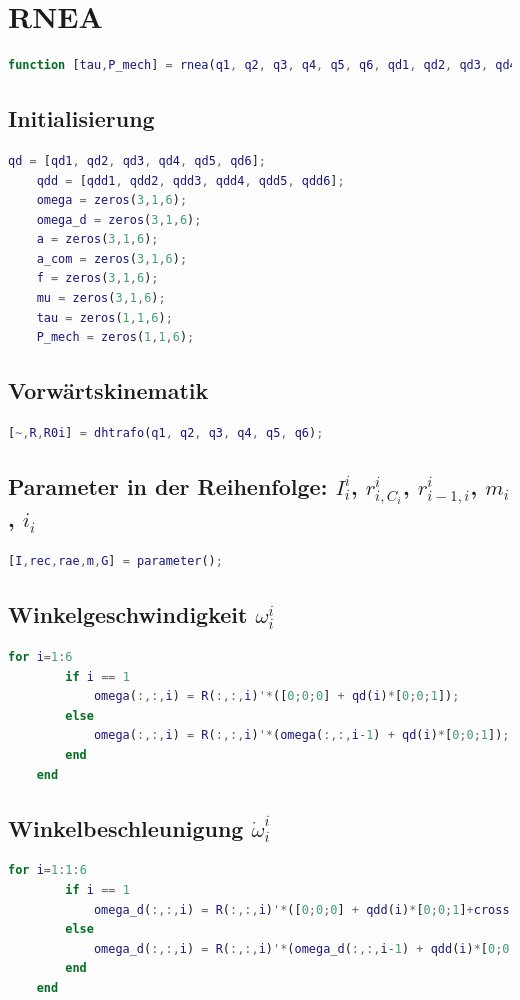 \section{RNEA}
\label{add:rnea}
%
\begin{lstlisting}[language=Matlab, numbers=none]
	function [tau,P_mech] = rnea(q1, q2, q3, q4, q5, q6, qd1, qd2, qd3, qd4, qd5, qd6, qdd1, qdd2, qdd3, qdd4, qdd5, qdd6)
\end{lstlisting}
%
\subsection{Initialisierung}
%
\begin{lstlisting}[language=Matlab, numbers=none]
	qd = [qd1, qd2, qd3, qd4, qd5, qd6];
	qdd = [qdd1, qdd2, qdd3, qdd4, qdd5, qdd6];
	omega = zeros(3,1,6);
	omega_d = zeros(3,1,6);
	a = zeros(3,1,6);
	a_com = zeros(3,1,6);
	f = zeros(3,1,6);
	mu = zeros(3,1,6);
	tau = zeros(1,1,6);
	P_mech = zeros(1,1,6);
\end{lstlisting}
%
\subsection{Vorwärtskinematik}
%
\begin{lstlisting}[language=Matlab, numbers=none]
	[~,R,R0i] = dhtrafo(q1, q2, q3, q4, q5, q6);
\end{lstlisting}
%
\subsection{Parameter in der Reihenfolge: $I^{i}_{i}$, $r^{i}_{i,C_i}$, $r^{i}_{i-1,i}$, $m_i$, $i_i$}
%
\begin{lstlisting}[language=Matlab, numbers=none]
	[I,rec,rae,m,G] = parameter();
\end{lstlisting}
%
\subsection{Winkelgeschwindigkeit $\omega^{i}_i$}
%
\begin{lstlisting}[language=Matlab, numbers=none]
	for i=1:6
		if i == 1
			omega(:,:,i) = R(:,:,i)'*([0;0;0] + qd(i)*[0;0;1]);
		else
			omega(:,:,i) = R(:,:,i)'*(omega(:,:,i-1) + qd(i)*[0;0;1]);
		end
	end
\end{lstlisting}
%
\subsection{Winkelbeschleunigung $\dot\omega^{i}_i$}
%
\begin{lstlisting}[language=Matlab, numbers=none]
	for i=1:1:6
		if i == 1
			omega_d(:,:,i) = R(:,:,i)'*([0;0;0] + qdd(i)*[0;0;1]+cross(qd(i)*[0;0;0], [0;0;1]));
		else
			omega_d(:,:,i) = R(:,:,i)'*(omega_d(:,:,i-1) + qdd(i)*[0;0;1]+cross(qd(i)*omega(:,:,i-1), [0;0;1]));
		end
	end
\end{lstlisting}
%
